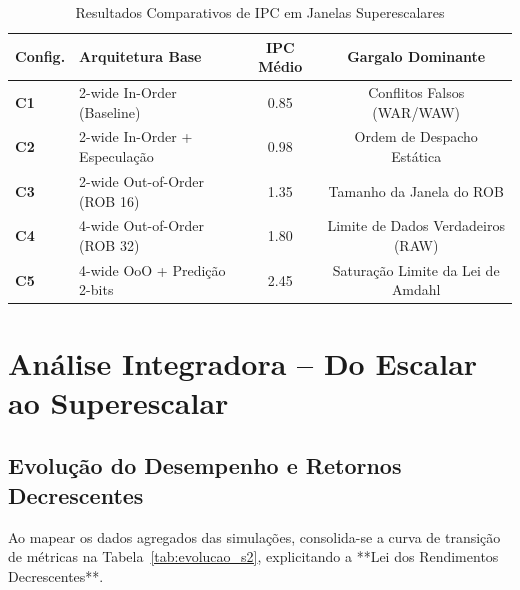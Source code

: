 \documentclass[12pt,a4paper]{article}
\begin{document}
\begin{table}[H]
\centering
\caption{Resultados Comparativos de IPC em Janelas Superescalares}
\label{tab:superescalar}
\begin{tabular}{@{}llcc@{}}
\toprule
\textbf{Config.} & \textbf{Arquitetura Base} & \textbf{IPC Médio} & \textbf{Gargalo Dominante} \\ \midrule
\textbf{C1} & 2-wide In-Order (Baseline) & 0.85 & Conflitos Falsos (WAR/WAW) \\
\textbf{C2} & 2-wide In-Order + Especulação & 0.98 & Ordem de Despacho Estática \\
\textbf{C3} & 2-wide Out-of-Order (ROB 16)  & 1.35 & Tamanho da Janela do ROB \\
\textbf{C4} & 4-wide Out-of-Order (ROB 32)  & 1.80 & Limite de Dados Verdadeiros (RAW) \\
\textbf{C5} & 4-wide OoO + Predição 2-bits  & 2.45 & Saturação Limite da Lei de Amdahl \\ \bottomrule
\end{tabular}
\end{table}

\newpage

\section{Análise Integradora -- Do Escalar ao Superescalar}
\label{sec:integradora}

\subsection{Evolução do Desempenho e Retornos Decrescentes}
Ao mapear os dados agregados das simulações, consolida-se a curva de transição de métricas na Tabela~\ref{tab:evolucao_s2}, explicitando a **Lei dos Rendimentos Decrescentes**.
\end{document}
